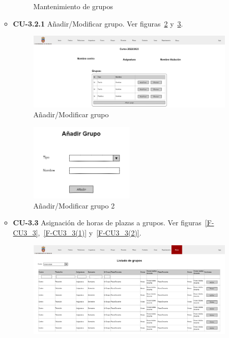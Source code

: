 \begin{itemize}
\begin{itemize}
\begin{figure}[!h]
		\caption{Mantenimiento de grupos}\label{F-CU3_2}
		\end{figure}
		\FloatBarrier
		\item \textbf{CU-3.2.1} Añadir/Modificar grupo. Ver figuras~\ref{F-CU3_2_1} y~\ref{F-CU3_2_1(1)}.
		\begin{figure}[!h]
		\centering
		\includegraphics[width=\textwidth]{../img/Anexos/Vistas/addmod_grupo.png}
		\caption{Añadir/Modificar grupo}\label{F-CU3_2_1}
		\end{figure}
		\FloatBarrier
		\begin{figure}[!h]
		\centering
		\includegraphics[width=0.5\textwidth]{../img/Anexos/Vistas/add_grupo.png}
		\caption{Añadir/Modificar grupo 2}\label{F-CU3_2_1(1)}
		\end{figure}
		\FloatBarrier
		\newpage
		\item \textbf{CU-3.3} Asignación de horas de plazas a grupos. Ver figuras~\ref{F-CU3_3},~\ref{F-CU3_3(1)} y~\ref{F-CU3_3(2)}. 
		\begin{figure}[!h]
		\centering
		\includegraphics[width=\textwidth]{../img/Anexos/Vistas/horas.png}

\end{figure}
\end{itemize}
\end{itemize}
